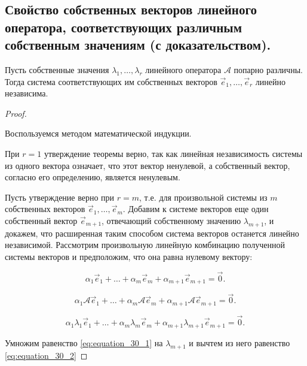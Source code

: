 \subsection{
    Свойство собственных векторов линейного оператора, соответствующих различным собственным значениям (с доказательством).
}

\begin{theorem}
    Пусть собственные значения $\lambda_1, \ldots, \lambda_r$ линейного оператора $\mathscr{A}$ попарно различны. Тогда система соответствующих им собственных векторов $\vec{e}_1, \ldots, \vec{e}_r$ линейно независима.
\end{theorem}

\begin{proof}~

    Воспользуемся методом математической индукции.

    При $r = 1$ утверждение теоремы верно, так как линейная независимость системы из одного вектора означает, что этот вектор ненулевой, а собственный вектор, согласно его определению, является ненулевым.

    Пусть утверждение верно при $r = m$, т.е. для произвольной системы из $m$ собственных векторов $\vec{e}_1, \ldots, \vec{e}_m$. Добавим к системе векторов еще один собственный вектор $\vec{e}_{m + 1}$, отвечающий собственному значению $\lambda_{m + 1}$, и докажем, что расширенная таким способом система векторов останется линейно независимой. Рассмотрим произвольную линейную комбинацию полученной системы векторов и предположим, что она равна нулевому вектору:

    \begin{equation}
        \alpha_1\vec{e}_1 + \ldots + \alpha_m\vec{e}_m + \alpha_{m + 1}\vec{e}_{m + 1} = \vec{0}.
        \label{eq:equation_30_1}
    \end{equation}

    $$\alpha_1\mathscr{A}\vec{e}_1 + \ldots + \alpha_m\mathscr{A}\vec{e}_m + \alpha_{m + 1}\mathscr{A}\vec{e}_{m + 1} = \vec{0}.$$

    \begin{equation}
        \alpha_1\lambda_1\vec{e}_1 + \ldots + \alpha_m\lambda_m\vec{e}_m + \alpha_{m + 1}\lambda_{m + 1}\vec{e}_{m + 1} = \vec{0}.
        \label{eq:equation_30_2}
    \end{equation}

    Умножим равенство \eqref{eq:equation_30_1} на $\lambda_{m + 1}$ и вычтем из него равенство \eqref{eq:equation_30_2}


\end{proof}
